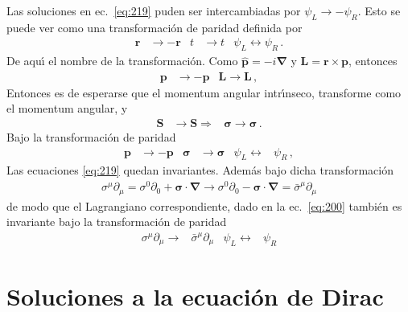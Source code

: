 Las soluciones en ec.~\eqref{eq:219} puden ser intercambiadas por $\psi_L\to -\psi_R$. Esto se puede ver como una transformaci\'on de paridad definida por
\begin{align}
  \mathbf{r}&\to-\mathbf{r}& t&\to t& \psi_L\leftrightarrow \psi_R\,.
\end{align}
De aqu\'\i{} el nombre de la transformaci\'on. Como $\hat{\mathbf{p}}=-i\boldsymbol{\nabla}$ y $\mathbf{L}=\mathbf{r}\times\mathbf{p}$, entonces
\begin{align}
  \mathbf{p}&\to-\mathbf{p}& \mathbf{L}\to\mathbf{L}\,,
\end{align}
Entonces es de esperarse que el momentum angular intr\'\i nseco, transforme como el momentum angular, y
\begin{align}
  \mathbf{S}&\to \mathbf{S}\Rightarrow& \boldsymbol{\sigma}\to\boldsymbol{\sigma}\,.
\end{align}
Bajo la transformaci\'on de paridad
\begin{align}
   \mathbf{p}&\to-\mathbf{p}& \boldsymbol{\sigma}&\to \boldsymbol{\sigma}& \psi_L\leftrightarrow &\psi_R\,,
\end{align}
Las ecuaciones \eqref{eq:219} quedan invariantes. Adem\'as bajo dicha transformaci\'on
\begin{align}
  \sigma^\mu\partial_\mu=\sigma^0\partial_0+\boldsymbol{\sigma}\cdot\boldsymbol{\nabla}\to \sigma^0\partial_0-\boldsymbol{\sigma}\cdot\boldsymbol{\nabla}=\bar{\sigma}^\mu\partial_\mu
\end{align}
de modo que el Lagrangiano correspondiente, dado en la ec.~\eqref{eq:200} tambi\'en es invariante bajo la transformaci\'on de paridad
\begin{align}
  \sigma^\mu\partial_\mu\to& \bar{\sigma}^\mu\partial_\mu &\psi_L\leftrightarrow &\psi_R
\end{align}



\chapter{Soluciones a la ecuación de Dirac}
\label{cha:dfermiones}



